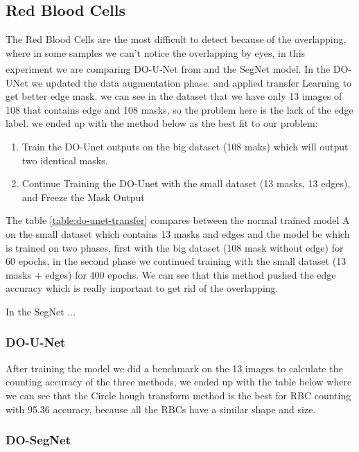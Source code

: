 \subsection{Red Blood Cells}
The Red Blood Cells are the most difficult to detect because of the overlapping, where in some samples we can't notice the overlapping by eyes, in this experiment we are comparing DO-U-Net from \textsuperscript{\cite{10.1007/978-3-030-44584-3_31}} and the SegNet model.
In the DO-UNet we updated the data augmentation phase. and applied transfer Learning to get better edge mask. we can see in the dataset that we have only 13 images of 108 that contains edge and 108 masks, so the problem here is the lack of the edge label. we ended up with the method below as the best fit to our problem:
\begin{enumerate}
    \item Train the DO-Unet outputs on the big dataset (108 maks) which will output two identical masks.
    \item Continue Training the DO-Unet with the small dataset (13 masks, 13 edges), and Freeze the Mask Output
\end{enumerate}



The table \ref{table:do-unet-transfer} compares between the normal trained model A on the small dataset which contains 13 masks and edges and the model be which is trained on two phases, first with the big dataset (108 mask without edge) for 60 epochs, in the second phase we continued training with the small dataset (13 masks + edges) for 400 epochs.
We can see that this method pushed the edge accuracy which is really important to get rid of the overlapping.

In the SegNet ... %

\subsubsection{DO-U-Net}
After training the model we did a benchmark on the 13 images to calculate the counting accuracy of the three methods, we ended up with the table below where we can see that the Circle hough transform method is the best for RBC counting with 95.36 accuracy, because all the RBCs have a similar shape and size.




\subsubsection{DO-SegNet}


